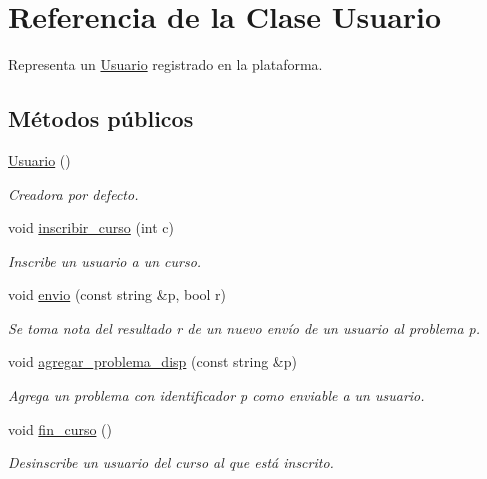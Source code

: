 \hypertarget{class_usuario}{}\section{Referencia de la Clase Usuario}
\label{class_usuario}


Representa un \mbox{\hyperlink{class_usuario}{Usuario}} registrado en la plataforma.  


\subsection*{Métodos públicos}
\begin{DoxyCompactItemize}
\item 
\mbox{\hyperlink{class_usuario_aa85a5371a098dfba5449140d9b8a472f}{Usuario}} ()
\begin{DoxyCompactList}\small\item\em Creadora por defecto. \end{DoxyCompactList}\item 
void \mbox{\hyperlink{class_usuario_a1410eee3a91f3affc43eb562512bcfb0}{inscribir\+\_\+curso}} (int c)
\begin{DoxyCompactList}\small\item\em Inscribe un usuario a un curso. \end{DoxyCompactList}\item 
void \mbox{\hyperlink{class_usuario_a6c6272b10e0f3795062d39cd9689a9db}{envio}} (const string \&p, bool r)
\begin{DoxyCompactList}\small\item\em Se toma nota del resultado r de un nuevo envío de un usuario al problema p. \end{DoxyCompactList}\item 
void \mbox{\hyperlink{class_usuario_a4dedcdcfe3d1769d6d2106d9fb2f7e51}{agregar\+\_\+problema\+\_\+disp}} (const string \&p)
\begin{DoxyCompactList}\small\item\em Agrega un problema con identificador p como enviable a un usuario. \end{DoxyCompactList}\item 
void \mbox{\hyperlink{class_usuario_a2db0039da08a135391248e34343d1ebd}{fin\+\_\+curso}} ()
\begin{DoxyCompactList}\small\item\em Desinscribe un usuario del curso al que está inscrito. \end{DoxyCompactList}\item 

\end{DoxyCompactItemize}
